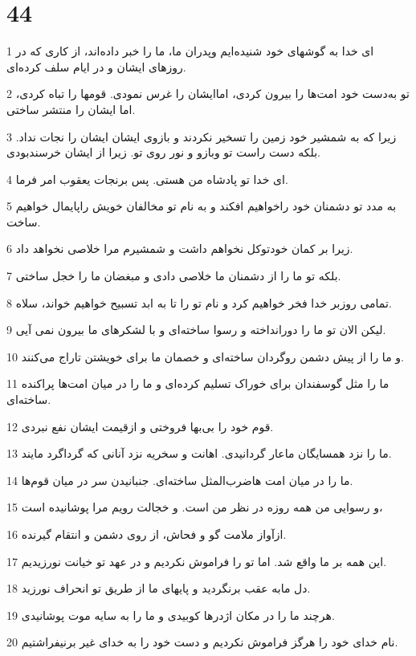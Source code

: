\chapter{44}

\par 1 ای خدا به گوشهای خود شنیده‌ایم وپدران ما، ما را خبر داده‌اند، از کاری که در روزهای ایشان و در ایام سلف کرده‌ای.
\par 2 تو به‌دست خود امت‌ها را بیرون کردی، اماایشان را غرس نمودی. قومها را تباه کردی، اما ایشان را منتشر ساختی.
\par 3 زیرا که به شمشیر خود زمین را تسخیر نکردند و بازوی ایشان ایشان را نجات نداد. بلکه دست راست تو وبازو و نور روی تو. زیرا از ایشان خرسندبودی.
\par 4 ‌ای خدا تو پادشاه من هستی. پس برنجات یعقوب امر فرما.
\par 5 به مدد تو دشمنان خود راخواهیم افکند و به نام تو مخالفان خویش راپایمال خواهیم ساخت.
\par 6 زیرا بر کمان خودتوکل نخواهم داشت و شمشیرم مرا خلاصی نخواهد داد.
\par 7 بلکه تو ما را از دشمنان ما خلاصی دادی و مبغضان ما را خجل ساختی.
\par 8 تمامی روزبر خدا فخر خواهیم کرد و نام تو را تا به ابد تسبیح خواهیم خواند، سلاه.
\par 9 لیکن الان تو ما را دورانداخته و رسوا ساخته‌ای و با لشکرهای ما بیرون نمی آیی.
\par 10 و ما را از پیش دشمن روگردان ساخته‌ای و خصمان ما برای خویشتن تاراج می‌کنند.
\par 11 ما را مثل گوسفندان برای خوراک تسلیم کرده‌ای و ما را در میان امت‌ها پراکنده ساخته‌ای. 
\par 12 قوم خود را بی‌بها فروختی و ازقیمت ایشان نفع نبردی.
\par 13 ما را نزد همسایگان ماعار گردانیدی. اهانت و سخریه نزد آنانی که گرداگرد مایند.
\par 14 ما را در میان امت هاضرب‌المثل ساخته‌ای. جنبانیدن سر در میان قوم‌ها.
\par 15 و رسوایی من همه روزه در نظر من است. و خجالت رویم مرا پوشانیده است،
\par 16 ازآواز ملامت گو و فحاش، از روی دشمن و انتقام گیرنده.
\par 17 این همه بر ما واقع شد. اما تو را فراموش نکردیم و در عهد تو خیانت نورزیدیم.
\par 18 دل مابه عقب برنگردید و پایهای ما از طریق تو انحراف نورزید.
\par 19 هرچند ما را در مکان اژدرها کوبیدی و ما را به سایه موت پوشانیدی.
\par 20 نام خدای خود را هرگز فراموش نکردیم و دست خود را به خدای غیر برنیفراشتیم.
